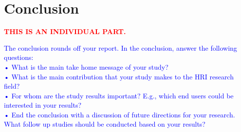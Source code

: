 \documentclass[conference]{IEEEtran}
\begin{document}
\section{Conclusion}

\textcolor{red}{\textbf{THIS IS AN INDIVIDUAL PART.}}

\textcolor{blue}{The conclusion rounds off your report. In the conclusion, answer the following questions:\\
• What is the main take home message of your study?\\
• What is the main contribution that your study makes to the HRI research field?\\
• For whom are the study results important? E.g., which end users could be interested 
in your results?\\
• End the conclusion with a discussion of future directions for your research. What follow 
up studies should be conducted based on your results?}



\end{document}
